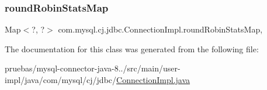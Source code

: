 \subsubsection{\texorpdfstring{round\+Robin\+Stats\+Map}{roundRobinStatsMap}}
{\footnotesize\ttfamily Map$<$?, ?$>$ com.\+mysql.\+cj.\+jdbc.\+Connection\+Impl.\+round\+Robin\+Stats\+Map\hspace{0.3cm}{\ttfamily [static]}, {\ttfamily [protected]}}



The documentation for this class was generated from the following file\+:\begin{DoxyCompactItemize}
\item 
pruebas/mysql-\/connector-\/java-\/8../src/main/user-\/impl/java/com/mysql/cj/jdbc/\mbox{\hyperlink{_connection_impl_8java}{Connection\+Impl.\+java}}\end{DoxyCompactItemize}
